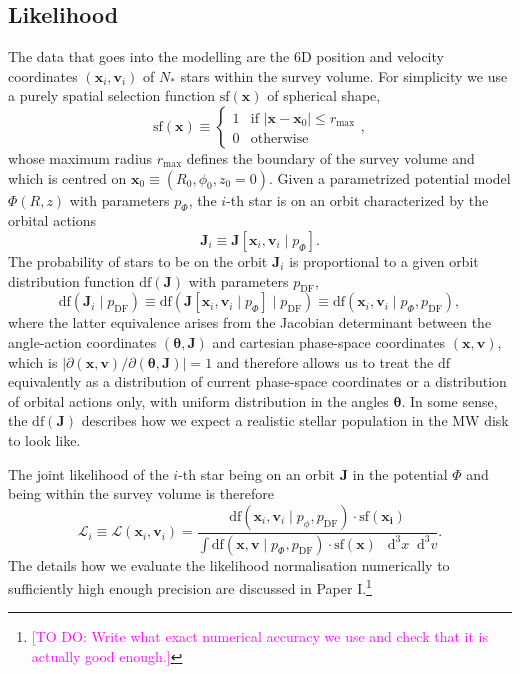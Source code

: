 \documentclass[iop,revtex4,numberedappendix,appendixfloats]{emulateapj}
\newcommand{\vect}[1]{\boldsymbol{#1}}
\newcommand*\Diff[1]{\mathop{}\!\mathrm{d^#1}}
\newcommand{\Wilma}[1]{\textcolor{Magenta}{#1}}
\begin{document}
\subsection{Likelihood} \label{sec:likelihood}

The data that goes into the modelling are the 6D position and velocity coordinates $(\vect{x}_i,\vect{v}_i)$ of $N_*$ stars within the survey volume. For simplicity we use a purely spatial selection function $\text{sf}(\vect{x})$ of spherical shape,
\begin{equation*}
\text{sf}(\vect{x}) \equiv \begin{cases} 1 &\mbox{if } \left| \vect{x}-\vect{x}_0 \right| \leq r_\text{max} \\
0 & \mbox{otherwise} \end{cases},
\end{equation*}
whose maximum radius $r_\text{max}$ defines the boundary of the survey volume and which is centred on $\vect{x}_0 \equiv (R_0,\phi_0,z_0=0)$. Given a parametrized potential model $\Phi(R,z)$ with parameters $p_\Phi$, the $i$-th star is on an orbit characterized by the orbital actions 
\begin{equation*}
\vect{J}_i \equiv \vect{J}[\vect{x}_i,\vect{v}_i \mid p_\Phi].
\end{equation*}
The probability of stars to be on the orbit $\vect{J}_i$ is proportional to a given orbit distribution function $\text{df}(\vect{J})$ with parameters $p_\text{DF}$,
\begin{equation*}
\text{df}(\vect{J}_i \mid p_\text{DF}) \equiv \text{df}(\vect{J}[\vect{x}_i,\vect{v}_i \mid p_\Phi] \mid p_\text{DF}) \equiv \text{df}(\vect{x}_i,\vect{v}_i \mid p_\Phi,p_\text{DF}),
\end{equation*} 
where the latter equivalence arises from the Jacobian determinant between the angle-action coordinates $(\vect{\theta},\vect{J})$ and cartesian phase-space coordinates $(\vect{x},\vect{v})$, which is $\left| \partial (\vect{x},\vect{v}) / \partial(\vect{\theta},\vect{J})\right|=1$ and therefore allows us to treat the $\text{df}$ equivalently as a distribution of current phase-space coordinates or a distribution of orbital actions only, with uniform distribution in the angles $\vect{\theta}$. In some sense, the $\text{df}(\vect{J})$ describes how we expect a realistic stellar population in the MW disk to look like.

The joint likelihood of the $i$-th star being on an orbit $\vect{J}$ in the potential $\Phi$ and being within the survey volume is therefore
\begin{equation*}
\mathscr{L}_i \equiv \mathscr{L}(\vect{x}_i,\vect{v}_i) = \frac{\text{df}(\vect{x}_i,\vect{v}_i\mid p_\phi, p_\text{DF}) \cdot \text{sf}(\vect{x_i})}{\int \text{df}(\vect{x},\vect{v}\mid p_\Phi, p_\text{DF}) \cdot \text{sf}(\vect{x}) \ \Diff3 x \Diff3 v}.
\end{equation*}
The details how we evaluate the likelihood normalisation numerically to sufficiently high enough precision are discussed in Paper I.\footnote{\Wilma{[TO DO: Write what exact numerical accuracy we use and check that it is actually good enough.]}}
\end{document}
